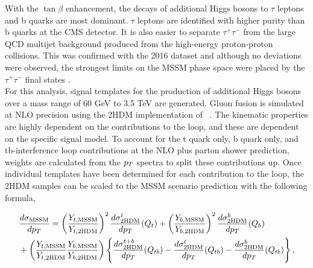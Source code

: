 With the $\tan\beta$ enhancement, the decays of additional Higgs bosons to $\tau$ leptons and b quarks are most dominant.
$\tau$ leptons are identified with higher purity than b quarks at the \ac{CMS} detector.
It is also easier to separate $\tau^{+}\tau^{-}$ from the large \ac{QCD} multijet background produced from the high-energy proton-proton collisions.
This was confirmed with the 2016 dataset and although no deviations were observed, the strongest limits on the \ac{MSSM} phase space were placed by the $\tau^+\tau^-$ final states \cite{CMS_MSSM_Tau_2018,CMS:2018hir}. \\

For this analysis, signal templates for the production of additional Higgs bosons over a mass range of 60 GeV to 3.5 TeV are generated.
Gluon fusion is simulated at \ac{NLO} precision using the \ac{2HDM} implementation of ~\cite{Nason:2004rx,Frixione:2007vw,Alioli:2010xd,Jezo:2015aia}.
The kinematic properties are highly dependent on the contributions to the loop, and these are dependent on the specific signal model.
To account for the t quark only, b quark only, and tb-interference loop contributions at the \ac{NLO} plus parton shower prediction, weights are calculated from the $p_{T}$ spectra to split these contributions up.
Once individual templates have been determined for each contribution to the loop, the \ac{2HDM} samples can be scaled to the \ac{MSSM} scenario prediction with the following formula,

\begin{align}
& \frac{d\sigma_{\text{MSSM}}}{dp_{T}}  = \left(\frac{Y_{t,\text{MSSM}}}{Y_{t,\text{2HDM}}}\right)^{2}\frac{d\sigma^{t}_{\text{2HDM}}}{dp_{T}}(Q_{t}) + \left(\frac{Y_{b,\text{MSSM}}}{Y_{b,\text{2HDM}}}\right)^{2}\frac{d\sigma^{b}_{\text{2HDM}}}{dp_{T}}(Q_{b}) \nonumber \\
& + \left(\frac{Y_{t,\text{MSSM}}}{Y_{t,\text{2HDM}}}\frac{Y_{b,\text{MSSM}}}{Y_{b,\text{2HDM}}}\right) \left\{ \frac{d\sigma^{t+b}_{\text{2HDM}}}{dp_{T}}(Q_{tb}) - \frac{d\sigma^{t}_{\text{2HDM}}}{dp_{T}}(Q_{tb}) - \frac{d\sigma^{b}_{\text{2HDM}}}{dp_{T}}(Q_{tb}) \right\} ,
\label{eqn:mssm_xs}
\end{align}
\vspace{0.2cm}

